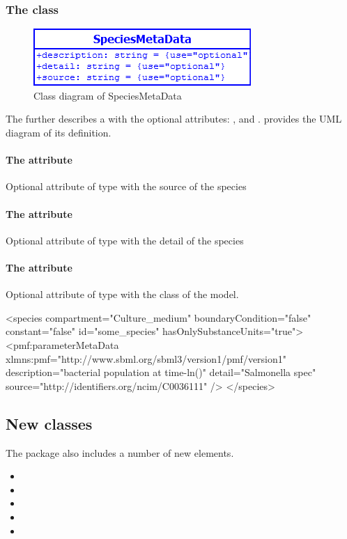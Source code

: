 \subsubsection{The  class}
\begin{figure}[h]
	\includegraphics[scale=0.8]{img/SpeciesMetaData}
	\caption{Class diagram of SpeciesMetaData}
	\label{SpeciesMetaData}
\end{figure}

\label{speciesmetadata-class}
The \SpeciesMetaData further describes a \Species with the optional attributes:
,  and . 
provides the UML diagram of its definition.

\paragraph{The  attribute}
Optional attribute of type  with the source of the species

\paragraph{The  attribute}
Optional attribute of type  with the detail of the species

\paragraph{The  attribute}
Optional attribute of type  with the class of the model.

\begin{example}
<species compartment="Culture_medium" boundaryCondition="false" constant="false"
  id="some_species" hasOnlySubstanceUnits="true">
  <pmf:parameterMetaData xlmns:pmf="http://www.sbml.org/sbml3/version1/pmf/version1"
    description="bacterial population at time-ln()" detail="Salmonella spec"
    source="http://identifiers.org/ncim/C0036111" />
</species>
\end{example}


\subsection{New classes}
The \Pmf package also includes a number of new elements.
\begin{itemize}
	\item \Correlation
	\item \DataSource
	\item \ModelVariable
	\item \Reference
	\item \UnitTransformation
\end{itemize}

